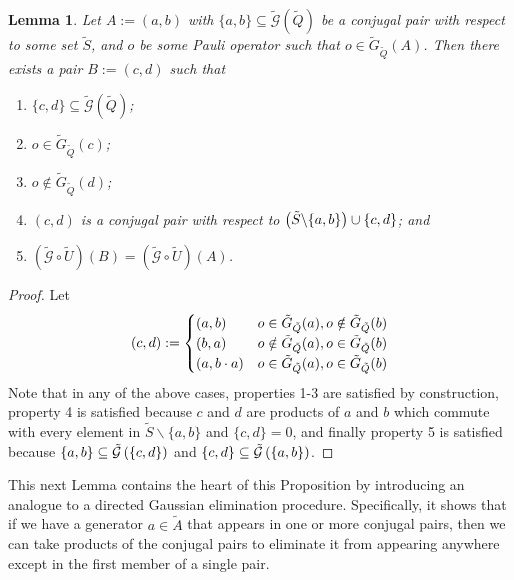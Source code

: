 \documentclass[twocolumn,showpacs,preprintnumbers,amsmath,amssymb,nofootinbib,pra,floatfix]{revtex4-1}
\newtheorem{lemma}{Lemma}
\newenvironment{remark}[1][Remark]{\begin{trivlist}
\item[\hskip \labelsep {\bfseries #1}]}{\end{trivlist}}
\newcommand{\set}{\tilde}
\newcommand{\genfun}{\tilde{\mathcal{G}}}
\begin{document}
\begin{lemma}
\label{single-pair-rearrangement}
Let $A:=(a,b)$ with $\{a,b\}\subseteq\genfun(\set Q)$ be a conjugal pair with respect to some set $\set S$, and $o$ be some Pauli operator such that $o\in\set G_{\set Q}(A)$.  Then there exists a pair $B:=(c,d)$ such that
\begin{enumerate}
\item $\{c,d\}\subseteq\genfun(\set Q)$;
\item $o\in \set G_{\set Q}(c)$;
\item $o\notin \set G_{\set Q}(d)$;
\item $(c,d)$ is a conjugal pair with respect to $\paren{\set S\backslash \{a,b\}}\cup\{c,d\}$; and
\item $(\genfun\circ\set U)(B) = (\genfun\circ\set U)(A)$.
\end{enumerate}
\end{lemma}

\begin{proof}
Let
$$
(c,d):=
\begin{cases}
\paren{a,b} & o\in \set G_{\set Q}(a), o\notin \set G_{\set Q}(b) \\
\paren{b,a} &  o\notin \set G_{\set Q}(a), o\in \set G_{\set Q}(b) \\
\paren{a,b\cdot a} & o\in \set G_{\set Q}(a), o\in \set G_{\set Q}(b) \\
\end{cases}
$$
Note that in any of the above cases, properties 1-3 are satisfied by construction, property 4 is satisfied because $c$ and $d$ are products of $a$ and $b$ which commute with every element in $\set S\backslash \{a,b\}$ and $\{c,d\}=0$, and finally property 5 is satisfied because $\{a,b\}\subseteq \genfun\paren{\{c,d\}}$ and $\{c,d\}\subseteq \genfun\paren{\{a,b\}}$.
\end{proof}
\begin{remark}
This next Lemma contains the heart of this Proposition by introducing an analogue to a directed Gaussian elimination procedure.  Specifically, it shows that if we have a generator $a\in\set A$ that appears in one or more conjugal pairs, then we can take products of the conjugal pairs to eliminate it from appearing anywhere except in the first member of a single pair.
\end{remark}
\end{document}
